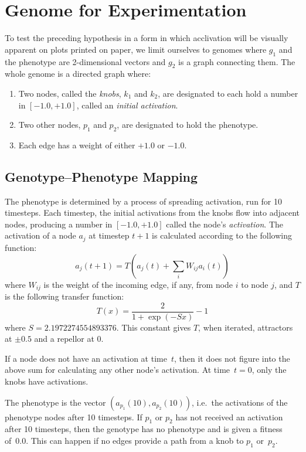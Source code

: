 \documentclass[letterpaper]{article}
\begin{document}
\section{Genome for Experimentation}

To test the preceding hypothesis in a form in which acclivation will be
visually apparent on plots printed on paper, we limit ourselves to genomes
where $g_1$ and the phenotype are 2-dimensional vectors and $g_2$ is a graph
connecting them.  The whole genome is a directed graph where:
\begin{enumerate}
   \item Two nodes, called the \textit{knobs}, $k_1$ and $k_2$, are designated
      to each hold a number in $[-1.0, +1.0]$, called an \textit{initial
      activation}.
   \item Two other nodes, $p_1$ and $p_2$, are designated to hold the
      phenotype.
   \item Each edge has a weight of either $+1.0$ or $-1.0$.
\end{enumerate}

\subsection{Genotype--Phenotype Mapping}

The phenotype is determined by a process of spreading activation, run for
10 timesteps. Each timestep, the initial activations from the knobs flow into
adjacent nodes, producing a number in $[-1.0, +1.0]$ called the node's
\textit{activation}. The activation of a node $a_j$ at timestep $t+1$ is
calculated according to the following function:
\[
   a_j(t+1) = T(a_j(t) + \sum_iW_{ij}a_i(t))
\]
where $W_{ij}$ is the weight of the incoming edge, if any, from node $i$ to
node $j$, and $T$ is the following transfer function:
\[
   T(x) = \frac{2}{1+\exp(-Sx)}-1
\]
where $S=2.1972274554893376$. This constant gives $T$, when iterated,
attractors at $\pm0.5$ and a repellor at 0.

If a node does not have an activation at time~$t$, then it does not figure
into the above sum for calculating any other node's activation. At time~$t=0$,
only the knobs have activations.

The phenotype is the vector $(a_{p_1}(10), a_{p_2}(10))$, i.e.~the activations
of the phenotype nodes after 10 timesteps. If $p_1$ or $p_2$ has not received
an activation after 10 timesteps, then the genotype has no phenotype and is
given a fitness of~0.0. This can happen if no edges provide a path from a knob
to $p_1$ or~$p_2$.
\end{document}

